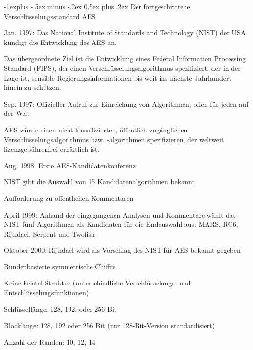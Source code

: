 \documentclass[a4paper]{article}
\makeatletter
\renewcommand{\subsection}{\@startsection{subsection}{2}{0mm}%
 {-1explus -.5ex minus -.2ex}%
 {0.5ex plus .2ex}%
 {\normalfont\normalsize\bfseries}}
\makeatother
\begin{document}
\begin{multicols}{3}
      \subsection{Der fortgeschrittene Verschlüsselungsstandard AES}
      \begin{itemize*}
            \item Jan. 1997: Das National Institute of Standards and Technology (NIST)
            der USA kündigt die Entwicklung des AES an.
            \item Das übergeordnete Ziel ist die Entwicklung eines Federal Information Processing Standard (FIPS), der einen Verschlüsselungsalgorithmus spezifiziert, der in der Lage ist, sensible Regierungsinformationen bis weit ins nächste Jahrhundert hinein zu schützen.
            \item Sep. 1997: Offizieller Aufruf zur Einreichung von Algorithmen, offen
            für jeden auf der Welt
            \item AES würde einen nicht klassifizierten, öffentlich zugänglichen Verschlüsselungsalgorithmus bzw. -algorithmen spezifizieren, der weltweit lizenzgebührenfrei erhältlich ist.
            \item Aug. 1998: Erste AES-Kandidatenkonferenz
            \begin{itemize*}
                  \item NIST gibt die Auswahl von 15 Kandidatenalgorithmen bekannt
                  \item Aufforderung zu öffentlichen Kommentaren
            \end{itemize*}
            \item April 1999: Anhand der eingegangenen Analysen und Kommentare wählt das NIST fünf Algorithmen als Kandidaten für die Endauswahl aus: MARS, RC6, Rijndael, Serpent und Twofish
            \item Oktober 2000: Rijndael wird als Vorschlag des NIST für AES bekannt gegeben
            \item Rundenbasierte symmetrische Chiffre
            \item Keine Feistel-Struktur (unterschiedliche Verschlüsselungs- und
            Entschlüsselungsfunktionen)
            \item Schlüssellänge: 128, 192, oder 256 Bit
            \item Blocklänge: 128, 192 oder 256 Bit (nur 128-Bit-Version standardisiert)
            \item Anzahl der Runden: 10, 12, 14
      \end{itemize*}


\end{multicols}
\end{document}
